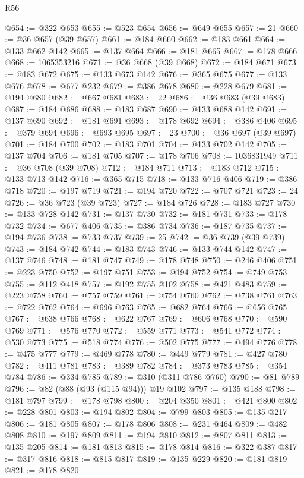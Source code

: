 \begin{lexlean}{R56}
\begin{coremodule}
@654 := @322 @653
@655 := @523 @654
@656 := @649 @655
@657 := 21
@660 := @36 @657 (@39 @657)
@661 := @184 @660
@662 := @183 @661
@664 := @133 @662 @142
@665 := @137 @664
@666 := @181 @665
@667 := @178 @666
@668 := 1065353216
@671 := @36 @668 (@39 @668)
@672 := @184 @671
@673 := @183 @672
@675 := @133 @673 @142
@676 := @365 @675
@677 := @133 @676
@678 := @677 @232
@679 := @386 @678
@680 := @228 @679
@681 := @194 @680
@682 := @667 @681
@683 := 22
@686 := @36 @683 (@39 @683)
@687 := @184 @686
@688 := @183 @687
@690 := @133 @688 @142
@691 := @137 @690
@692 := @181 @691
@693 := @178 @692
@694 := @386 @406
@695 := @379 @694
@696 := @693 @695
@697 := 23
@700 := @36 @697 (@39 @697)
@701 := @184 @700
@702 := @183 @701
@704 := @133 @702 @142
@705 := @137 @704
@706 := @181 @705
@707 := @178 @706
@708 := 1036831949
@711 := @36 @708 (@39 @708)
@712 := @184 @711
@713 := @183 @712
@715 := @133 @713 @142
@716 := @365 @715
@718 := @133 @716 @406
@719 := @386 @718
@720 := @197 @719
@721 := @194 @720
@722 := @707 @721
@723 := 24
@726 := @36 @723 (@39 @723)
@727 := @184 @726
@728 := @183 @727
@730 := @133 @728 @142
@731 := @137 @730
@732 := @181 @731
@733 := @178 @732
@734 := @677 @406
@735 := @386 @734
@736 := @187 @735
@737 := @194 @736
@738 := @733 @737
@739 := 25
@742 := @36 @739 (@39 @739)
@743 := @184 @742
@744 := @183 @743
@746 := @133 @744 @142
@747 := @137 @746
@748 := @181 @747
@749 := @178 @748
@750 := @246 @406
@751 := @223 @750
@752 := @197 @751
@753 := @194 @752
@754 := @749 @753
@755 := @112 @418
@757 := @192 @755 @102
@758 := @421 @483
@759 := @223 @758
@760 := @757 @759
@761 := @754 @760
@762 := @738 @761
@763 := @722 @762
@764 := @696 @763
@765 := @682 @764
@766 := @656 @765
@767 := @638 @766
@768 := @622 @767
@769 := @606 @768
@770 := @590 @769
@771 := @576 @770
@772 := @559 @771
@773 := @541 @772
@774 := @530 @773
@775 := @518 @774
@776 := @502 @775
@777 := @494 @776
@778 := @475 @777
@779 := @469 @778
@780 := @449 @779
@781 := @427 @780
@782 := @411 @781
@783 := @389 @782
@784 := @373 @783
@785 := @354 @784
@786 := @334 @785
@789 := @310 (@311 @786 @760)
@790 := @81 @789
@796 := @82 (@88 (@93 (@115 @94))) @19 @102
@797 := @135 @188
@798 := @181 @797
@799 := @178 @798
@800 := @204 @350
@801 := @421 @800
@802 := @228 @801
@803 := @194 @802
@804 := @799 @803
@805 := @135 @217
@806 := @181 @805
@807 := @178 @806
@808 := @231 @464
@809 := @482 @808
@810 := @197 @809
@811 := @194 @810
@812 := @807 @811
@813 := @135 @205
@814 := @181 @813
@815 := @178 @814
@816 := @322 @387
@817 := @317 @816
@818 := @815 @817
@819 := @135 @229
@820 := @181 @819
@821 := @178 @820

\end{coremodule}
\end{lexlean}
